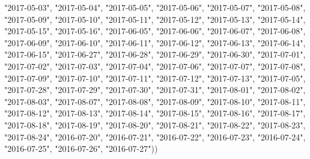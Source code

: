 \documentclass[
]{article}
\newenvironment{Shaded}{\begin{snugshade}}{\end{snugshade}}
\newcommand{\NormalTok}[1]{#1}
\newcommand{\StringTok}[1]{\textcolor[rgb]{0.31,0.60,0.02}{#1}}
\begin{document}
\begin{Shaded}
\begin{Highlighting}[]
\StringTok{"2017-05-03"}\NormalTok{,}
\StringTok{"2017-05-04"}\NormalTok{,}
\StringTok{"2017-05-05"}\NormalTok{,}
\StringTok{"2017-05-06"}\NormalTok{, }
\StringTok{"2017-05-07"}\NormalTok{,}
\StringTok{"2017-05-08"}\NormalTok{,}
\StringTok{"2017-05-09"}\NormalTok{,}
\StringTok{"2017-05-10"}\NormalTok{,}
\StringTok{"2017-05-11"}\NormalTok{,}
\StringTok{"2017-05-12"}\NormalTok{,}
\StringTok{"2017-05-13"}\NormalTok{,}
\StringTok{"2017-05-14"}\NormalTok{,}
\StringTok{"2017-05-15"}\NormalTok{,}
\StringTok{"2017-05-16"}\NormalTok{,}
\StringTok{"2017-06-05"}\NormalTok{,}
\StringTok{"2017-06-06"}\NormalTok{,}
\StringTok{"2017-06-07"}\NormalTok{,}
\StringTok{"2017-06-08"}\NormalTok{,}
\StringTok{"2017-06-09"}\NormalTok{,}
\StringTok{"2017-06-10"}\NormalTok{,}
\StringTok{"2017-06-11"}\NormalTok{,}
\StringTok{"2017-06-12"}\NormalTok{,}
\StringTok{"2017-06-13"}\NormalTok{,}
\StringTok{"2017-06-14"}\NormalTok{,}
\StringTok{"2017-06-15"}\NormalTok{,}
\StringTok{"2017-06-27"}\NormalTok{,}
\StringTok{"2017-06-28"}\NormalTok{,}
\StringTok{"2017-06-29"}\NormalTok{,}
\StringTok{"2017-06-30"}\NormalTok{,}
\StringTok{"2017-07-01"}\NormalTok{,}
\StringTok{"2017-07-02"}\NormalTok{,}
\StringTok{"2017-07-03"}\NormalTok{,}
\StringTok{"2017-07-04"}\NormalTok{,}
\StringTok{"2017-07-06"}\NormalTok{,}
\StringTok{"2017-07-07"}\NormalTok{,}
\StringTok{"2017-07-08"}\NormalTok{,}
\StringTok{"2017-07-09"}\NormalTok{,}
\StringTok{"2017-07-10"}\NormalTok{,}
\StringTok{"2017-07-11"}\NormalTok{,}
\StringTok{"2017-07-12"}\NormalTok{,}
\StringTok{"2017-07-13"}\NormalTok{,}
\StringTok{"2017-07-05"}\NormalTok{,}
\StringTok{"2017-07-28"}\NormalTok{,}
\StringTok{"2017-07-29"}\NormalTok{,}
\StringTok{"2017-07-30"}\NormalTok{,}
\StringTok{"2017-07-31"}\NormalTok{,}
\StringTok{"2017-08-01"}\NormalTok{,}
\StringTok{"2017-08-02"}\NormalTok{,}
\StringTok{"2017-08-03"}\NormalTok{,}
\StringTok{"2017-08-07"}\NormalTok{,}
\StringTok{"2017-08-08"}\NormalTok{,}
\StringTok{"2017-08-09"}\NormalTok{,}
\StringTok{"2017-08-10"}\NormalTok{,}
\StringTok{"2017-08-11"}\NormalTok{,}
\StringTok{"2017-08-12"}\NormalTok{,}
\StringTok{"2017-08-13"}\NormalTok{,}
\StringTok{"2017-08-14"}\NormalTok{,}
\StringTok{"2017-08-15"}\NormalTok{,}
\StringTok{"2017-08-16"}\NormalTok{,}
\StringTok{"2017-08-17"}\NormalTok{,}
\StringTok{"2017-08-18"}\NormalTok{,}
\StringTok{"2017-08-19"}\NormalTok{,}
\StringTok{"2017-08-20"}\NormalTok{,}
\StringTok{"2017-08-21"}\NormalTok{,}
\StringTok{"2017-08-22"}\NormalTok{,}
\StringTok{"2017-08-23"}\NormalTok{,}
\StringTok{"2017-08-24"}\NormalTok{,}
\StringTok{"2016-07-20"}\NormalTok{,}
\StringTok{"2016-07-21"}\NormalTok{,}
\StringTok{"2016-07-22"}\NormalTok{,}
\StringTok{"2016-07-23"}\NormalTok{,}
\StringTok{"2016-07-24"}\NormalTok{,}
\StringTok{"2016-07-25"}\NormalTok{,}
\StringTok{"2016-07-26"}\NormalTok{,}
\StringTok{"2016-07-27"}\NormalTok{))}
\end{Highlighting}
\end{Shaded}
\end{document}
